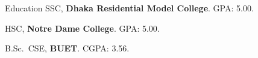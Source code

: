 \begin{rubric}{Education}
\entry*[2015 -- 2017]%
	SSC, \textbf{Dhaka Residential Model College}. GPA: 5.00.

\entry*[2017 -- 2019]%
	HSC, \textbf{Notre Dame College}. GPA: 5.00.

\entry*[2020 -- 2025]%
	B.Sc.~CSE, \textbf{BUET}. CGPA: 3.56.

\end{rubric}
